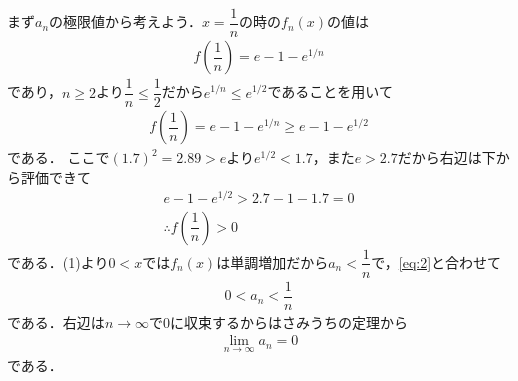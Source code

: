 \documentclass[../../main.tex]{subfiles}
\begin{document}
まず$a_n$の極限値から考えよう．$x=\dfrac{1}{n}$の時の$f_n(x)$の値は
\begin{align}
  f\left(\dfrac{1}{n}\right)=e-1-e^{1/n}
\end{align}
であり，$n\ge 2$より$\dfrac{1}{n}\le \dfrac{1}{2}$だから$e^{1/n}\le e^{1/2}$であることを用いて
\begin{align}
  f\left(\dfrac{1}{n}\right)=e-1-e^{1/n}\ge e-1-e^{1/2}
\end{align}
である．
ここで$(1.7)^2=2.89>e$より$e^{1/2}<1.7$，また$e>2.7$だから右辺は下から評価できて
\begin{align}
  e-1-e^{1/2}>2.7-1-1.7=0 \\
  \therefore
  f\left(\dfrac{1}{n}\right) > 0
\end{align}
である．(1)より$0<x$では$f_n(x)$は単調増加だから$a_n<\dfrac{1}{n}$で，\cref{eq:2}と合わせて
\begin{align}
  0<a_n<\dfrac{1}{n}
\end{align}
である．右辺は$n\to\infty$で$0$に収束するからはさみうちの定理から
\begin{align}
  \lim_{n\to\infty}a_n = 0 \label{eq:3}
\end{align}
である．
\end{document}
